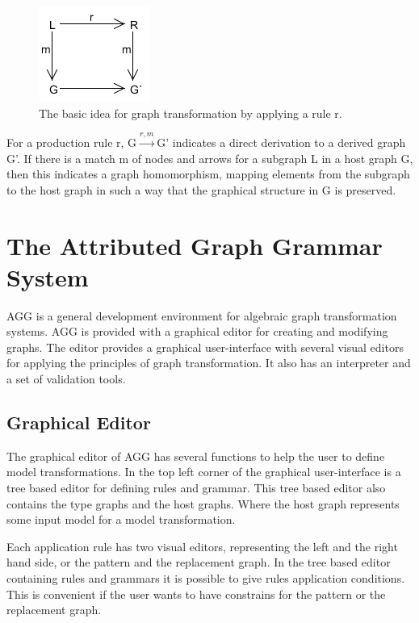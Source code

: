 \documentclass[pdftex,11pt,a4paper]{article}
\begin{document}
\begin{figure}[H]
	\centering
	\includegraphics[scale=0.7]{figures/GraphTransformationGeneral.png}
	\caption{The basic idea for graph transformation by applying a rule r.}
	\label{fig:GraphTransformationGeneral}
\end{figure}

For a production rule r, \mbox{G$\xrightarrow{r,m}$G'} indicates a direct
derivation to a derived graph G'. If there is a match m of nodes and arrows for a
subgraph L in a host graph G, then this indicates a graph homomorphism, mapping
elements from the subgraph to the host graph in such a way that the graphical
structure in G is preserved.

\section{The Attributed Graph Grammar System}

\noindent AGG is a general development environment for algebraic graph
transformation systems. AGG is provided with a graphical editor for creating
and modifying graphs. The editor provides a graphical user-interface with
several visual editors for applying the principles of graph transformation. It
also has an interpreter and a set of validation tools.

\subsection{Graphical Editor}
\noindent The graphical editor of AGG has several functions to help the user to
define model transformations. In the top left corner of the graphical user-interface is
a tree based editor for defining rules and grammar. This tree based editor also
contains the type graphs and the host graphs. Where the host graph represents
some input model for a model transformation.

\indent Each application rule has two visual editors, representing the left and
the right hand side, or the pattern and the replacement graph. In the tree based
editor containing rules and grammars it is possible to give rules application
conditions. This is convenient if the user wants to have constrains for the
pattern or the replacement graph.
\end{document}
